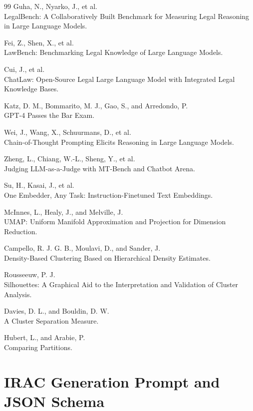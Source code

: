 \documentclass[11pt]{article}
\begin{document}
\begin{thebibliography}{99}
Guha, N., Nyarko, J., et al.\\
LegalBench: A Collaboratively Built Benchmark for Measuring Legal Reasoning in Large Language Models.

Fei, Z., Shen, X., et al.\\
LawBench: Benchmarking Legal Knowledge of Large Language Models.

Cui, J., et al.\\
ChatLaw: Open-Source Legal Large Language Model with Integrated Legal Knowledge Bases.

Katz, D. M., Bommarito, M. J., Gao, S., and Arredondo, P.\\
GPT-4 Passes the Bar Exam.

Wei, J., Wang, X., Schuurmans, D., et al.\\
Chain-of-Thought Prompting Elicits Reasoning in Large Language Models.

Zheng, L., Chiang, W.-L., Sheng, Y., et al.\\
Judging LLM-as-a-Judge with MT-Bench and Chatbot Arena.

Su, H., Kasai, J., et al.\\
One Embedder, Any Task: Instruction-Finetuned Text Embeddings.

McInnes, L., Healy, J., and Melville, J.\\
UMAP: Uniform Manifold Approximation and Projection for Dimension Reduction.

Campello, R. J. G. B., Moulavi, D., and Sander, J.\\
Density-Based Clustering Based on Hierarchical Density Estimates.

Rousseeuw, P. J.\\
Silhouettes: A Graphical Aid to the Interpretation and Validation of Cluster Analysis.

Davies, D. L., and Bouldin, D. W.\\
A Cluster Separation Measure.

Hubert, L., and Arabie, P.\\
Comparing Partitions.
\end{thebibliography}

\appendix
\section{IRAC Generation Prompt and JSON Schema}
\label{app:prompt_schema}
\end{document}
